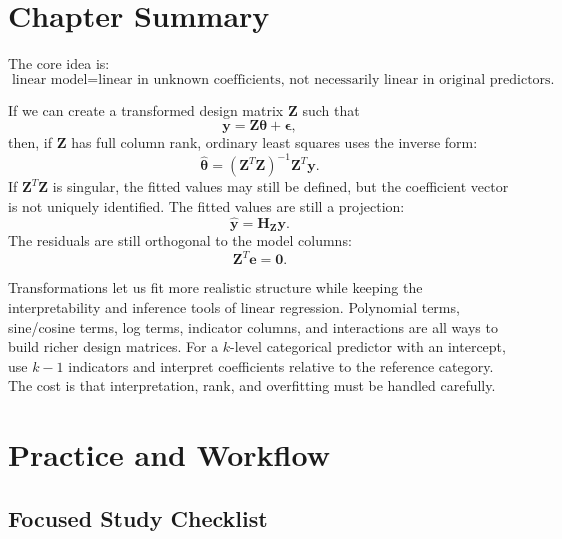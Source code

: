 {\section{Chapter Summary}

The core idea is:
\begin{equation}
  \boxed{
  \text{linear model} = \text{linear in unknown coefficients, not necessarily linear in original predictors.}
  }
\end{equation}

If we can create a transformed design matrix \(\mathbf{Z}\) such that
\begin{equation}
  \mathbf{y}=\mathbf{Z}\boldsymbol{\theta}+\boldsymbol{\epsilon},
\end{equation}
then, if \(\mathbf{Z}\) has full column rank, ordinary least squares uses the inverse form:
\begin{equation}
  \widehat{\boldsymbol{\theta}}
  =(\mathbf{Z}^T\mathbf{Z})^{-1}\mathbf{Z}^T\mathbf{y}.
\end{equation}
If \(\mathbf{Z}^T\mathbf{Z}\) is singular, the fitted values may still be defined, but the coefficient vector is not uniquely identified.
The fitted values are still a projection:
\begin{equation}
  \widehat{\mathbf{y}}=\mathbf{H}_{\mathbf{Z}}\mathbf{y}.
\end{equation}
The residuals are still orthogonal to the model columns:
\begin{equation}
  \mathbf{Z}^T\mathbf{e}=\mathbf{0}.
\end{equation}

Transformations let us fit more realistic structure while keeping the interpretability and inference tools of linear regression.  Polynomial terms, sine/cosine terms, log terms, indicator columns, and interactions are all ways to build richer design matrices.  For a \(k\)-level categorical predictor with an intercept, use \(k-1\) indicators and interpret coefficients relative to the reference category.  The cost is that interpretation, rank, and overfitting must be handled carefully.

\section{Practice and Workflow}
\subsection*{Focused Study Checklist}

}
